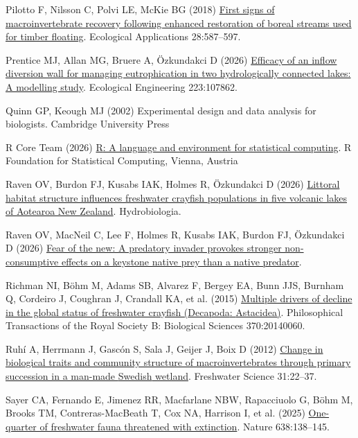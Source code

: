 \documentclass[
  letterpaper,
  DIV=11,
  numbers=noendperiod]{scrartcl}
\newlength{\cslhangindent}
\newenvironment{CSLReferences}[2] %
 {\begin{list}{}{%
  \setlength{\itemindent}{0pt}
  \setlength{\leftmargin}{0pt}
  \setlength{\parsep}{0pt}
  \ifodd #1
   \setlength{\leftmargin}{\cslhangindent}
   \setlength{\itemindent}{-1\cslhangindent}
  \fi
  \setlength{\itemsep}{#2\baselineskip}}}
 {\end{list}}
\begin{document}
\begin{CSLReferences}{1}{1}
Pilotto F, Nilsson C, Polvi LE, McKie BG (2018)
\href{https://doi.org/10.1002/eap.1672}{First signs of macroinvertebrate
recovery following enhanced restoration of boreal streams used for
timber floating}. Ecological Applications 28:587--597.

Prentice MJ, Allan MG, Bruere A, Özkundakci D (2026)
\href{https://doi.org/10.1016/j.ecoleng.2025.107862}{Efficacy of an
inflow diversion wall for managing eutrophication in two hydrologically
connected lakes: A modelling study}. Ecological Engineering 223:107862.

Quinn GP, Keough MJ (2002) Experimental design and data analysis for
biologists. Cambridge University Press

R Core Team (2026) \href{https://www.R-project.org/}{{R}: A language and
environment for statistical computing}. R Foundation for Statistical
Computing, Vienna, Austria

Raven OV, Burdon FJ, Kusabs IAK, Holmes R, Özkundakci D (2026)
\href{https://doi.org/10.1007/s10750-026-06302-z}{Littoral habitat
structure influences freshwater crayfish populations in five volcanic
lakes of {Aotearoa New Zealand}}. Hydrobiologia.

Raven OV, MacNeil C, Lee F, Holmes R, Kusabs IAK, Burdon FJ, Özkundakci
D (2026) \href{https://doi.org/10.21203/rs.3.rs-9891519/v1}{Fear of the
new: A predatory invader provokes stronger non-consumptive effects on a
keystone native prey than a native predator}.

Richman NI, Böhm M, Adams SB, Alvarez F, Bergey EA, Bunn JJS, Burnham Q,
Cordeiro J, Coughran J, Crandall KA, et al. (2015)
\href{https://doi.org/10.1098/rstb.2014.0060}{Multiple drivers of
decline in the global status of freshwater crayfish ({Decapoda}:
{Astacidea})}. Philosophical Transactions of the Royal Society B:
Biological Sciences 370:20140060.

Ruhí A, Herrmann J, Gascón S, Sala J, Geijer J, Boix D (2012)
\href{https://doi.org/10.1899/11-018.1}{Change in biological traits and
community structure of macroinvertebrates through primary succession in
a man-made {Swedish} wetland}. Freshwater Science 31:22--37.

Sayer CA, Fernando E, Jimenez RR, Macfarlane NBW, Rapacciuolo G, Böhm M,
Brooks TM, Contreras-MacBeath T, Cox NA, Harrison I, et al. (2025)
\href{https://doi.org/10.1038/s41586-024-08375-z}{One-quarter of
freshwater fauna threatened with extinction}. Nature 638:138--145.


\end{CSLReferences}
\end{document}
